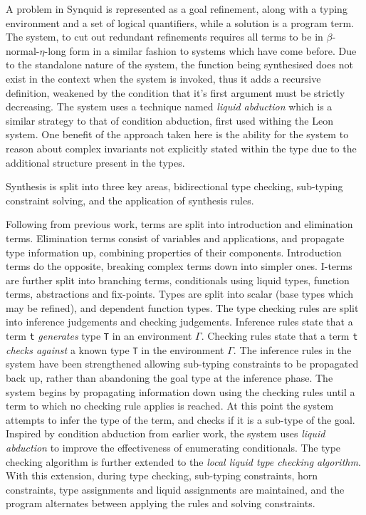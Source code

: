 \documentclass[a4paper]{article}
\begin{document}
A problem in Synquid is represented as a goal refinement, along with a typing environment and a set of logical quantifiers, 
while a solution is a program term. The system, to cut out redundant refinements requires all terms to be in \(\beta\)-normal-\(\eta\)-long 
form in a similar fashion to systems which have come before. Due to the standalone nature of the system, the function 
being synthesised does not exist in the context when the system is invoked, thus it adds a recursive definition, weakened by 
the condition that it's first argument must be strictly decreasing. The system uses a technique named \emph{liquid abduction} which 
is a similar strategy to that of condition abduction, first used withing the Leon system. One benefit of the approach taken here is the ability for the system 
to reason about complex invariants not explicitly stated within the type due to the additional structure present in the types.

Synthesis is split into three key areas, bidirectional type checking, sub-typing constraint solving, and the application of synthesis rules.

Following from previous work, terms are split into introduction and elimination terms. Elimination terms consist of 
variables and applications, and propagate type information up, combining properties of their components. Introduction 
terms do the opposite, breaking complex terms down into simpler ones. I-terms are further split into branching terms, 
conditionals using liquid types, function terms, abstractions and fix-points. Types are split into scalar (base types which may be refined),
and dependent function types. The type checking rules are split into inference judgements and checking judgements. 
Inference rules state that a term \texttt{t} \emph{generates} type \texttt{T} in an environment \(\Gamma\). Checking rules state that a term 
\texttt{t} \emph{checks against} a known type \texttt{T} in the environment \(\Gamma\). The inference rules in the system have been strengthened
allowing sub-typing constraints to be propagated back up, rather than abandoning the goal type at the inference phase.
The system begins by propagating information down using the checking rules until a term to which no checking rule
applies is reached. At this point the system attempts to infer the type of the term, and checks if it is a sub-type of the goal.  
Inspired by condition abduction from earlier work, the system uses \emph{liquid abduction} to improve the effectiveness of 
enumerating conditionals. The type checking algorithm is further extended to the \emph{local liquid type checking algorithm}.
With this extension, during type checking, sub-typing constraints, horn constraints, type assignments and liquid assignments 
are maintained, and the program alternates between applying the rules and solving constraints. 
\end{document}
